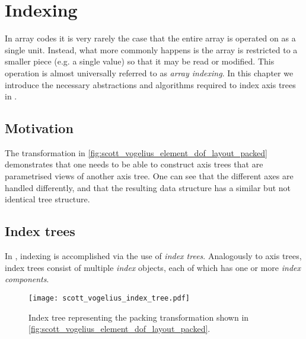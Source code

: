 \documentclass[thesis]{subfiles}
\begin{document}
\chapter{Indexing}
\label{chapter:indexing}

In array codes it is very rarely the case that the entire array is operated on as a single unit.
Instead, what more commonly happens is the array is restricted to a smaller piece (e.g. a single value) so that it may be read or modified.
This operation is almost universally referred to as \textit{array indexing}.
In this chapter we introduce the necessary abstractions and algorithms required to index axis trees in .

\section{Motivation}  %


The transformation in \cref{fig:scott_vogelius_element_dof_layout_packed} demonstrates that one needs to be able to construct axis trees that are parametrised views of another axis tree.
One can see that the different axes are handled differently, and that the resulting data structure has a similar but not identical tree structure.

\section{Index trees}
\label{sec:index_trees}

In , indexing is accomplished via the use of \textit{index trees}.
Analogously to axis trees, index trees consist of multiple \textit{index} objects, each of which has one or more \textit{index components}.


\begin{figure}
  \centering
  \texttt{[image: scott\_vogelius\_index\_tree.pdf]}
  \caption{Index tree representing the packing transformation shown in \cref{fig:scott_vogelius_element_dof_layout_packed}.}
  \label{fig:scott_vogelius_element_index_tree}
\end{figure}
\end{document}
